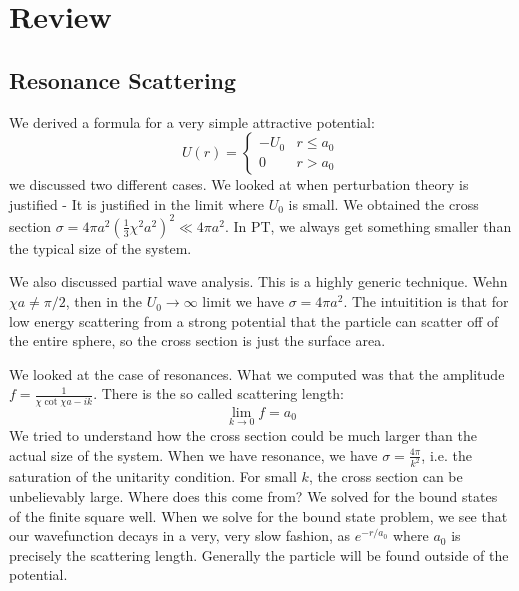 \section{Review}
\subsection{Resonance Scattering}
We derived a formula for a very simple attractive potential:
\begin{equation}
    U(r) = \begin{cases}
        -U_0 & r \leq a_0
        \\ 0 & r > a_0
    \end{cases}
\end{equation}
we discussed two different cases. We looked at when perturbation theory is justified - It is justified in the limit where $U_0$ is small. We obtained the cross section $\sigma = 4\pi a^2 \left(\frac{1}{3}\chi^2 a^2\right)^2 \ll 4\pi a^2$. In PT, we always get something smaller than the typical size of the system.

We also discussed partial wave analysis. This is a highly generic technique. Wehn $\chi a \neq \pi/2$, then in the $U_0 \to \infty$ limit we have $\sigma = 4\pi a^2$. The intuitition is that for low energy scattering from a strong potential that the particle can scatter off of the entire sphere, so the cross section is just the surface area.

We looked at the case of resonances. What we computed was that the amplitude $f = \frac{1}{\chi \cot \chi a - ik}$. There is the so called scattering length:
\begin{equation}
    \lim_{k \to 0}f = a_0
\end{equation}
We tried to understand how the cross section could be much larger than the actual size of the system. When we have resonance, we have $\sigma = \frac{4\pi}{k^2}$, i.e. the saturation of the unitarity condition. For small $k$, the cross section can be unbelievably large. Where does this come from? We solved for the bound states of the finite square well. When we solve for the bound state problem, we see that our wavefunction decays in a very, very slow fashion, as $e^{-r/a_0}$ where $a_0$ is precisely the scattering length. Generally the particle will be found outside of the potential.

